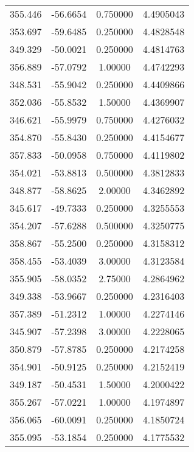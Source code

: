 \documentclass{article}
\begin{document}
\begin{tabular}{| c | c | c | c |}
      355.446 &      -56.6654 &      0.750000 &        4.4905043\\
      353.697 &      -59.6485 &      0.250000 &        4.4828548\\
      349.329 &      -50.0021 &      0.250000 &        4.4814763\\
      356.889 &      -57.0792 &       1.00000 &        4.4742293\\
      348.531 &      -55.9042 &      0.250000 &        4.4409866\\
      352.036 &      -55.8532 &       1.50000 &        4.4369907\\
      346.621 &      -55.9979 &      0.750000 &        4.4276032\\
      354.870 &      -55.8430 &      0.250000 &        4.4154677\\
      357.833 &      -50.0958 &      0.750000 &        4.4119802\\
      354.021 &      -53.8813 &      0.500000 &        4.3812833\\
      348.877 &      -58.8625 &       2.00000 &        4.3462892\\
      345.617 &      -49.7333 &      0.250000 &        4.3255553\\
      354.207 &      -57.6288 &      0.500000 &        4.3250775\\
      358.867 &      -55.2500 &      0.250000 &        4.3158312\\
      358.455 &      -53.4039 &       3.00000 &        4.3123584\\
      355.905 &      -58.0352 &       2.75000 &        4.2864962\\
      349.338 &      -53.9667 &      0.250000 &        4.2316403\\
      357.389 &      -51.2312 &       1.00000 &        4.2274146\\
      345.907 &      -57.2398 &       3.00000 &        4.2228065\\
      350.879 &      -57.8785 &      0.250000 &        4.2174258\\
      354.901 &      -50.9125 &      0.250000 &        4.2152419\\
      349.187 &      -50.4531 &       1.50000 &        4.2000422\\
      355.267 &      -57.0221 &       1.00000 &        4.1974897\\
      356.065 &      -60.0091 &      0.250000 &        4.1850724\\
      355.095 &      -53.1854 &      0.250000 &        4.1775532\\

\end{tabular}
\end{document}
